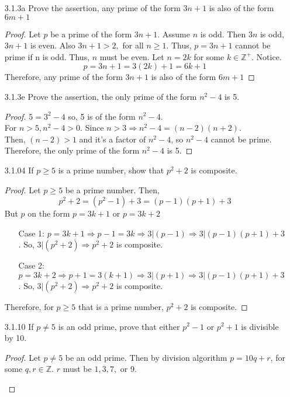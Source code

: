 \documentclass[12pt]{article}
\newcommand{\Z}{\mathds{Z}}
\begin{document}
\begin{enumerate}
	\item[3.1.3a] Prove the assertion, any prime of the form $ 3n+1 $ is also of the form $ 6m+1 $
		\begin{proof}
			
		Let $ p $ be a prime of the form $ 3n+1 $. Assume $ n $ is odd. Then $ 3n $ is odd, $ 3n+1 $ is even. Also $ 3n+1 > 2 , $ for all $ n \geq 1 $. Thus, $ p=3n+1 $ cannot be prime if n is odd. Thus, $ n $ must be even. Let $ n=2k $ for some $ k\in\Z^+ $. Notice.
		\[p=3n+1=3(2k)+1=6k+1\]
		Therefore, any prime of the form $ 3n+1 $ is also of the form $ 6m+1 $
	\end{proof}
	\item[3.1.3e] Prove the assertion, the only prime of the form $ n^2-4 $ is 5.
		\begin{proof}
			$ 5= 3^2-4 $ so, 5 is of the form $ n^2-4 $.\\
			For $ n >5 ,n^2-4>0$. Since $ n>3\Rightarrow n^2-4=(n-2)(n+2) $. \\
			Then, $ (n-2) > 1 $ and it's a factor of $ n^2-4 $, so $ n^2-4 $ cannot be prime.
			Therefore, the only prime of the form $ n^2-4 $ is 5.
		\end{proof}
	\item[3.1.04] If $ p\geq 5 $ is a prime number, show that $ p^2+2 $ is composite.
		\begin{proof}
			Let $ p \geq 5 $ be a prime number. Then,
			\[p^2+2=(p^2-1)+3=(p-1)(p+1)+3\]
			But $ p $ on the form $ p=3k+1 $ or $ p=3k+2 $
			\begin{enumerate}
				\item[Case 1:] $ p=3k+1 \Rightarrow p-1=3k\Rightarrow 3 | (p-1)\Rightarrow 3|(p-1)(p+1)+3 $. So, $ 3|(p^2+2)\Rightarrow p^2+2 $ is composite.
				\item[Case 2:] $ p=3k+2\Rightarrow p+1 = 3(k+1)\Rightarrow 3|(p+1)\Rightarrow 3|(p-1)(p+1)+3 $. So, $ 3|(p^2+2)\Rightarrow p^2+2 $ is composite.
			\end{enumerate}
		Therefore, for $ p\geq 5 $ that is a prime number, $ p^2+2 $ is composite.
		\end{proof}
	\item[3.1.10] If $ p \not = 5 $ is an odd prime, prove that either $ p^2-1 $ or $ p^2+1 $ is divisible by 10.
	\begin{proof}
		Let $ p \not = 5 $ be an odd prime. Then by division algorithm $ p=10q+r $, for some $ q,r\in\Z.$ $ r $ must be $1,3,7,$ or 9.
		\begin{enumerate}

\end{enumerate}
\end{proof}
\end{enumerate}
\end{document}
